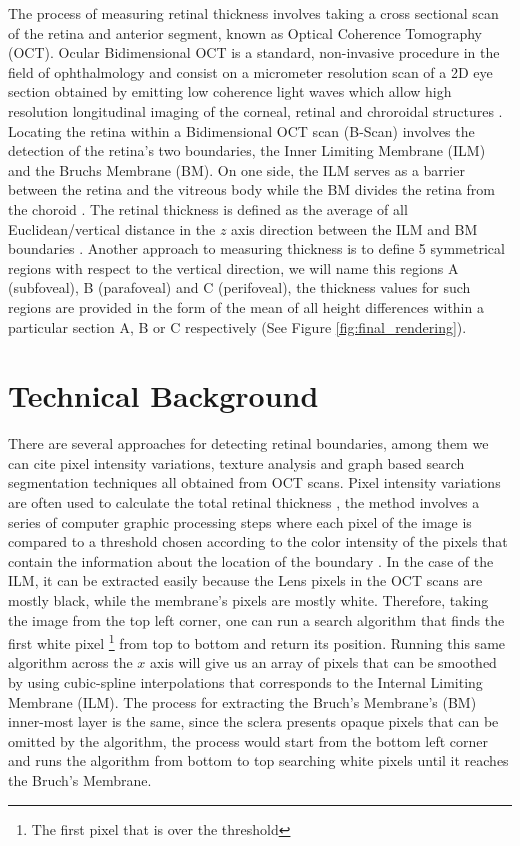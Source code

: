 \documentclass[12pt,a4paper]{scrartcl}
\begin{document}
The process of measuring retinal thickness involves taking a cross sectional scan of the retina and anterior segment, known as Optical Coherence Tomography (OCT). Ocular Bidimensional OCT is a standard, non-invasive procedure in the field of ophthalmology and consist on a micrometer resolution scan of a 2D eye section obtained by emitting low coherence light waves which allow high resolution longitudinal imaging of the corneal, retinal and chroroidal structures \cite{Ronchetti2019statistic}. Locating the retina within a Bidimensional OCT scan (B-Scan) involves the detection of the retina's two boundaries, the Inner Limiting Membrane (ILM) and the Bruchs Membrane (BM). On one side, the ILM serves as a barrier between the retina and the vitreous body \cite{MACNAIR2015343} while the BM divides the retina from the choroid \cite{BOOIJ20101}. The retinal thickness is defined as the average of all Euclidean/vertical distance in the $z$ axis direction between the ILM and BM boundaries \cite{Ronchetti2019statistic}. Another approach to measuring thickness is to define 5 symmetrical regions with respect to the vertical direction, we will name this regions A (subfoveal), B (parafoveal) and C (perifoveal), the thickness values for such regions are provided in the form of the mean of all height differences within a particular section A, B or C respectively \cite{Ronchetti2019statistic} (See Figure \ref{fig:final_rendering}). 

\section{Technical Background}\label{TechBack}

There are several approaches for detecting retinal boundaries, among them we can cite pixel intensity variations, texture analysis and graph based search segmentation techniques all obtained from OCT scans. Pixel intensity variations are often used to calculate the total retinal thickness \cite{Alonso-Caneiro2013}, the method involves a series of computer graphic processing steps where each pixel of the image is compared to a threshold chosen according to the color intensity of the pixels that contain the information about the location of the boundary \cite{Fabritius:09}. In the case of the ILM, it can be extracted easily because the Lens pixels in the OCT scans are mostly black, while the membrane's pixels are mostly white. Therefore, taking the image from the top left corner, one can run a search algorithm that finds the first white pixel \footnote{The first pixel that is over the threshold} from top to bottom and return its position. Running this same algorithm across the $x$ axis will give us an array of pixels that can be smoothed by using cubic-spline interpolations that corresponds to the Internal Limiting Membrane (ILM). The process for extracting the Bruch's Membrane's (BM) inner-most layer is the same, since the sclera presents opaque pixels that can be omitted by the algorithm, the process would start from the bottom left corner and runs the algorithm from bottom to top searching white pixels until it reaches the Bruch's Membrane.      
\end{document}
